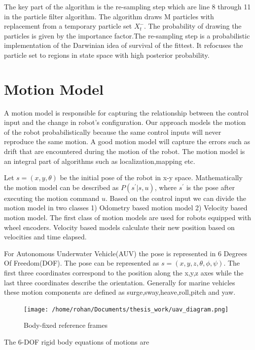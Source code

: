 \documentclass[12pt]{dalcsthesis}
\begin{document}
The key part of the algorithm is the re-sampling step which are line 8 through 11 in the particle filter algorithm. The algorithm draws M particles with replacement from a temporary particle set $X_{t}^{-}$. The probability of drawing the particles is given by the importance factor.The re-sampling step is a probabilistic implementation of the Darwinian idea of survival of the fittest. It refocuses the particle set to regions in state space with high posterior probability. 

\section{Motion Model}
A motion model is responsible for capturing the relationship between
the control input and the change in robot's configuration. Our approach
models the motion of the robot probabilistically because the same
control inputs will never reproduce the same motion. A good motion
model will capture the errors such as drift that are encountered during
the motion of the robot. The motion model is an integral part of algorithms
such as localization,mapping etc. 

Let $s=(x,y,\theta)$ be the initial pose of the robot in x-y space.
Mathematically the motion model can be described as $P(s^{'}|s,u)$,
where $s^{'}$ is the pose after executing the motion command $u$.
Based on the control input we can divide the motion model in two classes
1) Odometry based motion model 2) Velocity based motion model. The
first class of motion models are used for robots equipped with wheel
encoders. Velocity based models calculate their new position based
on velocities and time elapsed.

For Autonomous Underwater Vehicle(AUV) the pose is represented in
6 Degrees Of Freedom(DOF). The pose can be represented as $s=(x,y,z,\theta,\phi,\psi)$.
The first three coordinates correspond to the position along the x,y,z
axes while the last three coordinates describe the orientation. Generally
for marine vehicles these motion components are defined as surge,sway,heave,roll,pitch
and yaw. 

\begin{figure}
\caption{Body-fixed reference frames}


\texttt{[image: /home/rohan/Documents/thesis\_work/uav\_diagram.png]}

\end{figure}


The 6-DOF rigid body equations of motions are 
\end{document}
